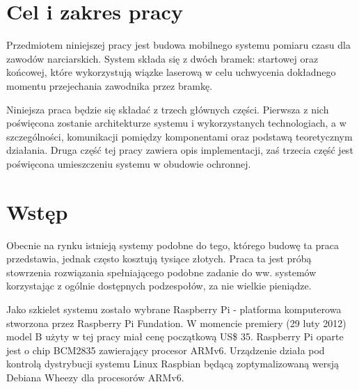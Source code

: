 \documentclass[11pt,a4paper, twoside]{article}
\begin{document}
 

\tableofcontents

\newpage
\cleardoublepage
\section{Cel i zakres pracy}
Przedmiotem niniejszej pracy jest budowa mobilnego systemu pomiaru czasu dla zawodów narciarskich. System składa się z dwóch bramek: startowej oraz końcowej, które wykorzystują wiązke laserową w celu uchwycenia dokładnego momentu przejechania zawodnika przez bramkę. 

Niniejsza praca będzie się składać z trzech głównych części. Pierwsza z nich poświęcona zostanie architekturze systemu i wykorzystanych technologiach, a w szczególności, komunikacji pomiędzy komponentami oraz podstawą teoretycznym działania. Druga część tej pracy zawiera opis implementacji, zaś trzecia część jest poświęcona umieszczeniu systemu w obudowie ochronnej.

\section{Wstęp}
Obecnie na rynku istnieją systemy podobne do tego, którego budowę ta praca przedstawia, jednak często kosztują tysiące złotych. Praca ta jest próbą stowrzenia rozwiązania spełniającego podobne zadanie do ww. systemów korzystając z ogólnie dostępnych podzespołów, za nie wielkie pieniądze.

Jako szkielet systemu zostało wybrane Raspberry Pi - platforma komputerowa stworzona przez Raspberry Pi Fundation. W momencie premiery (29 luty 2012) model B użyty w tej pracy miał cenę początkową US\$ 35. Raspberry Pi oparte jest o chip BCM2835 zawierający procesor ARMv6. Urządzenie działa pod kontrolą dystrybucji systemu Linux Raspbian będącą zoptymalizowaną wersją Debiana Wheezy dla procesorów ARMv6.
\end{document}
